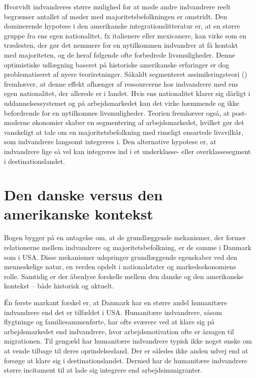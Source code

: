 \documentclass[
]{book}
\begin{document}
Hvorvidt indvandreres større mulighed for at møde andre indvandrere reelt begrænser antallet af møder med majoritetsbefolkningen er omstridt. Den dominerende hypotese i den amerikanske integrationslitteratur er, at en større gruppe fra ens egen nationalitet, fx italienere eller mexicanere, kan virke som en trædesten, der gør det nemmere for en nytilkommen indvandrer at få kontakt med majoriteten, og de heraf følgende ofte forbedrede livsmuligheder. Denne optimistiske udlægning baseret på historiske amerikanske erfaringer er dog problematiseret af nyere teoriretninger. Såkaldt segmenteret assimileringsteori () fremhæver, at denne effekt afhænger af ressourcerne hos indvandrere med ens egen nationalitet, der allerede er i landet. Hvis ens nationalitet klarer sig dårligt i uddannelsessystemet og på arbejdsmarkedet kan det virke hæmmende og ikke befordrende for en nytilkomnes livsmuligheder. Teorien fremhæver også, at post-moderne økonomier skaber en segmentering af arbejdsmarkedet, hvilket gør det vanskeligt at tale om en majoritetsbefolkning med rimeligt ensartede livsvilkår, som indvandrere langsomt integreres i. Den alternative hypotese er, at indvandrere lige så vel kan integreres ind i et underklasse- eller overklassesegment i destinationslandet.

\section{Den danske versus den amerikanske kontekst}\label{den-danske-versus-den-amerikanske-kontekst}

Bogen bygger på en antagelse om, at de grundlæggende mekanismer, der former relationerne mellem indvandrere og majoritetsbefolkning, er de samme i Danmark som i USA. Disse mekanismer udspringer grundlæggende egenskaber ved den menneskelige natur, en verden opdelt i nationalstater og markedsøkonomiens rolle. Samtidig er der åbenlyse forskelle mellem den danske og den amerikanske kontekst -- både historisk og aktuelt.

Én første markant forskel er, at Danmark har en større andel humanitære indvandrere end det er tilfældet i USA. Humanitære indvandrere, såsom flygtninge og familiesammenførte, har ofte sværere ved at klare sig på arbejdsmarkedet end indvandrere, hvor arbejdsmotivation ofte er årsagen til migrationen. Til gengæld har humanitære indvandrere typisk ikke noget ønske om at vende tilbage til deres oprindelsesland. Der er således ikke anden udvej end at forsøge at klare sig i destinationslandet. Dermed har de humanitære indvandrere større incitament til at lade sig integrere end arbejdsimmigranter.
\end{document}
